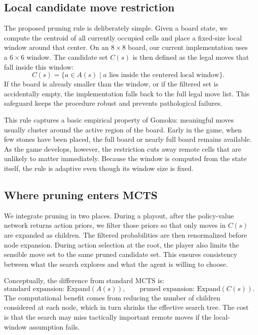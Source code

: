 \documentclass{article}
\begin{document}
\subsection{Local candidate move restriction}

The proposed pruning rule is deliberately simple. Given a board state, we compute the centroid of all currently occupied cells and place a fixed-size local window around that center. On an \(8 \times 8\) board, our current implementation uses a \(6 \times 6\) window. The candidate set \(C(s)\) is then defined as the legal moves that fall inside this window:
\begin{equation}
  C(s) = \{ a \in A(s) \mid a \text{ lies inside the centered local window} \}.
\end{equation}
If the board is already smaller than the window, or if the filtered set is accidentally empty, the implementation falls back to the full legal move list. This safeguard keeps the procedure robust and prevents pathological failures.

This rule captures a basic empirical property of Gomoku: meaningful moves usually cluster around the active region of the board. Early in the game, when few stones have been placed, the full board or nearly full board remains available. As the game develops, however, the restriction cuts away remote cells that are unlikely to matter immediately. Because the window is computed from the state itself, the rule is adaptive even though its window size is fixed.

\subsection{Where pruning enters MCTS}

We integrate pruning in two places. During a playout, after the policy-value network returns action priors, we filter those priors so that only moves in \(C(s)\) are expanded as children. The filtered probabilities are then renormalized before node expansion. During action selection at the root, the player also limits the sensible move set to the same pruned candidate set. This ensures consistency between what the search explores and what the agent is willing to choose.

Conceptually, the difference from standard MCTS is:
\begin{equation}
  \text{standard expansion: } \mathrm{Expand}(A(s)), \qquad
  \text{pruned expansion: } \mathrm{Expand}(C(s)).
\end{equation}
The computational benefit comes from reducing the number of children considered at each node, which in turn shrinks the effective search tree. The cost is that the search may miss tactically important remote moves if the local-window assumption fails.
\end{document}
